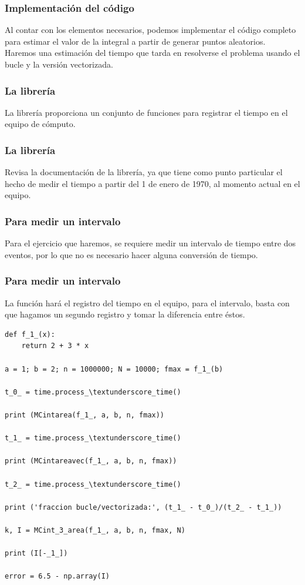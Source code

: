 \documentclass[12pt]{beamer}
\begin{document}
\begin{frame}
\frametitle{Implementación del código}
Al contar con los elementos necesarios, podemos implementar el código completo para estimar el valor de la integral a partir de generar puntos aleatorios.
\\
\bigskip
\pause
Haremos una estimación del tiempo que tarda en resolverse el problema usando el bucle y la versión vectorizada.
\end{frame}
\begin{frame}
\frametitle{La librería }
La librería  proporciona un conjunto de funciones para registrar el tiempo en el equipo de cómputo.
\end{frame}
\begin{frame}
\frametitle{La librería }
Revisa la documentación de la librería, ya que tiene como punto particular el hecho de medir el tiempo a partir del 1 de enero de 1970, al momento actual en el equipo.
\end{frame}
\begin{frame}
\frametitle{Para medir un intervalo}
Para el ejercicio que haremos, se requiere medir un intervalo de tiempo entre dos eventos, por lo que no es necesario hacer alguna conversión de tiempo.
\end{frame}
\begin{frame}
\frametitle{Para medir un intervalo}
La función  hará el registro del tiempo en el equipo, para el intervalo, basta con que hagamos un segundo registro y tomar la diferencia entre éstos.
\end{frame}
\begin{frame}
\begin{lstlisting}[caption=Implementación del código, style=FormattedNumber, basicstyle=\linespread{1.1}\ttfamily=\small, columns=fullflexible]
def f_1_(x):
    return 2 + 3 * x

a = 1; b = 2; n = 1000000; N = 10000; fmax = f_1_(b)

t_0_ = time.process_\textunderscore_time()

print (MCintarea(f_1_, a, b, n, fmax))

t_1_ = time.process_\textunderscore_time()

print (MCintareavec(f_1_, a, b, n, fmax))

t_2_ = time.process_\textunderscore_time()

print ('fraccion bucle/vectorizada:', (t_1_ - t_0_)/(t_2_ - t_1_))

k, I = MCint_3_area(f_1_, a, b, n, fmax, N)

print (I[-_1_])

error = 6.5 - np.array(I)
\end{lstlisting}
\end{frame}
\end{document}
